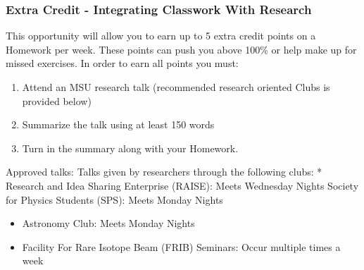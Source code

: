 \documentclass[11pt]{article}
\begin{document}
    \subsubsection{Extra Credit - Integrating Classwork With
Research}\label{extra-credit---integrating-classwork-with-research}

This opportunity will allow you to earn up to 5 extra credit points on a
Homework per week. These points can push you above 100\% or help make up
for missed exercises. In order to earn all points you must:

\begin{enumerate}
\def\labelenumi{\arabic{enumi}.}
\item
  Attend an MSU research talk (recommended research oriented Clubs is
  provided below)
\item
  Summarize the talk using at least 150 words
\item
  Turn in the summary along with your Homework.
\end{enumerate}

Approved talks: Talks given by researchers through the following clubs:
* Research and Idea Sharing Enterprise (RAISE)\hspace{0pt}: Meets
Wednesday Nights Society for Physics Students (SPS)\hspace{0pt}: Meets
Monday Nights

\begin{itemize}
\item
  Astronomy Club\hspace{0pt}: Meets Monday Nights
\item
  Facility For Rare Isotope Beam (FRIB) Seminars: \hspace{0pt}Occur
  multiple times a week
\end{itemize}

    


    
    
    
\end{document}
